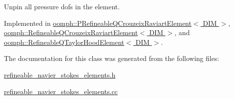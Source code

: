 Unpin all pressure dofs in the element. 



Implemented in \hyperlink{classoomph_1_1PRefineableQCrouzeixRaviartElement_a686b52095b423b9d7173aa338e8a7d33}{oomph\+::\+P\+Refineable\+Q\+Crouzeix\+Raviart\+Element$<$ D\+I\+M $>$}, \hyperlink{classoomph_1_1RefineableQCrouzeixRaviartElement_a4aa807058435a5efc4b1c28cefc4d080}{oomph\+::\+Refineable\+Q\+Crouzeix\+Raviart\+Element$<$ D\+I\+M $>$}, and \hyperlink{classoomph_1_1RefineableQTaylorHoodElement_a130b113b3de095ab4f17e18f3659c84a}{oomph\+::\+Refineable\+Q\+Taylor\+Hood\+Element$<$ D\+I\+M $>$}.



The documentation for this class was generated from the following files\+:\begin{DoxyCompactItemize}
\item 
\hyperlink{refineable__navier__stokes__elements_8h}{refineable\+\_\+navier\+\_\+stokes\+\_\+elements.\+h}\item 
\hyperlink{refineable__navier__stokes__elements_8cc}{refineable\+\_\+navier\+\_\+stokes\+\_\+elements.\+cc}\end{DoxyCompactItemize}
